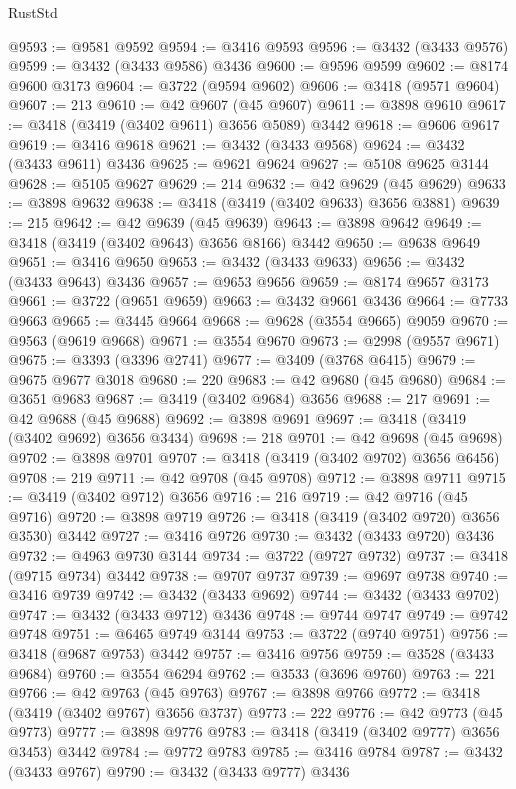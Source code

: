 \begin{lexlean}{RustStd}
\begin{coremodule}
@9593 := @9581 @9592
@9594 := @3416 @9593
@9596 := @3432 (@3433 @9576)
@9599 := @3432 (@3433 @9586) @3436
@9600 := @9596 @9599
@9602 := @8174 @9600 @3173
@9604 := @3722 (@9594 @9602)
@9606 := @3418 (@9571 @9604)
@9607 := 213
@9610 := @42 @9607 (@45 @9607)
@9611 := @3898 @9610
@9617 := @3418 (@3419 (@3402 @9611) @3656 @5089) @3442
@9618 := @9606 @9617
@9619 := @3416 @9618
@9621 := @3432 (@3433 @9568)
@9624 := @3432 (@3433 @9611) @3436
@9625 := @9621 @9624
@9627 := @5108 @9625 @3144
@9628 := @5105 @9627
@9629 := 214
@9632 := @42 @9629 (@45 @9629)
@9633 := @3898 @9632
@9638 := @3418 (@3419 (@3402 @9633) @3656 @3881)
@9639 := 215
@9642 := @42 @9639 (@45 @9639)
@9643 := @3898 @9642
@9649 := @3418 (@3419 (@3402 @9643) @3656 @8166) @3442
@9650 := @9638 @9649
@9651 := @3416 @9650
@9653 := @3432 (@3433 @9633)
@9656 := @3432 (@3433 @9643) @3436
@9657 := @9653 @9656
@9659 := @8174 @9657 @3173
@9661 := @3722 (@9651 @9659)
@9663 := @3432 @9661 @3436
@9664 := @7733 @9663
@9665 := @3445 @9664
@9668 := @9628 (@3554 @9665) @9059
@9670 := @9563 (@9619 @9668)
@9671 := @3554 @9670
@9673 := @2998 (@9557 @9671)
@9675 := @3393 (@3396 @2741)
@9677 := @3409 (@3768 @6415)
@9679 := @9675 @9677 @3018
@9680 := 220
@9683 := @42 @9680 (@45 @9680)
@9684 := @3651 @9683
@9687 := @3419 (@3402 @9684) @3656
@9688 := 217
@9691 := @42 @9688 (@45 @9688)
@9692 := @3898 @9691
@9697 := @3418 (@3419 (@3402 @9692) @3656 @3434)
@9698 := 218
@9701 := @42 @9698 (@45 @9698)
@9702 := @3898 @9701
@9707 := @3418 (@3419 (@3402 @9702) @3656 @6456)
@9708 := 219
@9711 := @42 @9708 (@45 @9708)
@9712 := @3898 @9711
@9715 := @3419 (@3402 @9712) @3656
@9716 := 216
@9719 := @42 @9716 (@45 @9716)
@9720 := @3898 @9719
@9726 := @3418 (@3419 (@3402 @9720) @3656 @3530) @3442
@9727 := @3416 @9726
@9730 := @3432 (@3433 @9720) @3436
@9732 := @4963 @9730 @3144
@9734 := @3722 (@9727 @9732)
@9737 := @3418 (@9715 @9734) @3442
@9738 := @9707 @9737
@9739 := @9697 @9738
@9740 := @3416 @9739
@9742 := @3432 (@3433 @9692)
@9744 := @3432 (@3433 @9702)
@9747 := @3432 (@3433 @9712) @3436
@9748 := @9744 @9747
@9749 := @9742 @9748
@9751 := @6465 @9749 @3144
@9753 := @3722 (@9740 @9751)
@9756 := @3418 (@9687 @9753) @3442
@9757 := @3416 @9756
@9759 := @3528 (@3433 @9684)
@9760 := @3554 @6294
@9762 := @3533 (@3696 @9760)
@9763 := 221
@9766 := @42 @9763 (@45 @9763)
@9767 := @3898 @9766
@9772 := @3418 (@3419 (@3402 @9767) @3656 @3737)
@9773 := 222
@9776 := @42 @9773 (@45 @9773)
@9777 := @3898 @9776
@9783 := @3418 (@3419 (@3402 @9777) @3656 @3453) @3442
@9784 := @9772 @9783
@9785 := @3416 @9784
@9787 := @3432 (@3433 @9767)
@9790 := @3432 (@3433 @9777) @3436

\end{coremodule}
\end{lexlean}

